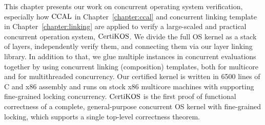 This chapter presents our work on concurrent operating system verification, especially 
how $\mathrm{CCAL}$ in Chapter~\ref{chapter:ccal} and concurrent linking template in Chapter~\ref{chapter:linking} are applied 
to verify a large-scaled and practical concurrent operation system, $\mathrm{CertiKOS}$.
We divide the full OS kernel as a stack of layers, independently verify them, 
and connecting them via our layer linking library. 
In addition to that, 
we glue multiple instances in concurrent evaluations together by using concurrent linking (composition) templates, both for multicore and for multithreaded concurrency.  
Our certified kernel is written in 6500 lines of C and x86 assembly
and runs on stock x86 multicore machines with supporting fine-grained locking concurrency. 
$\mathrm{CertiKOS}$ is the first proof of functional correctness of a complete,
general-purpose concurrent OS kernel with fine-grained locking,
which supports a single top-level correctness theorem. 

